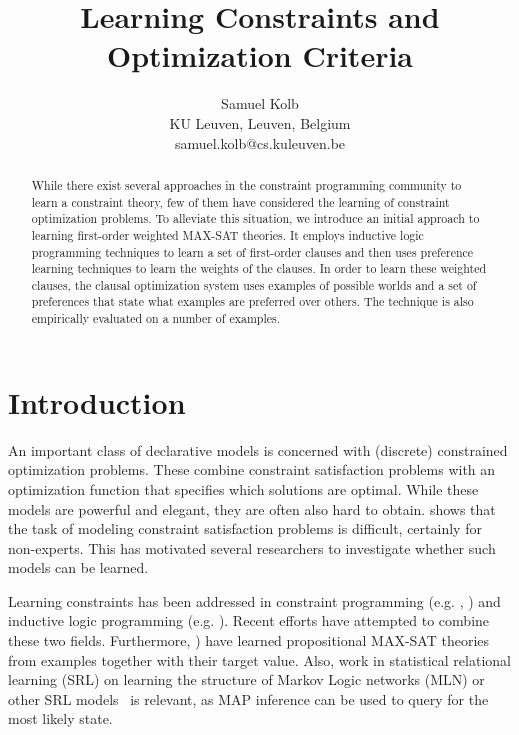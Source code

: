 \documentclass[letterpaper]{article}
\theoremstyle{definition}
\begin{document}
\title{Learning Constraints and Optimization Criteria}
\author{
  Samuel Kolb\\
  KU Leuven, Leuven, Belgium\\
  samuel.kolb@cs.kuleuven.be
}

\maketitle

\begin{abstract}
While there exist several approaches in the constraint programming community to learn a constraint theory, few of them have considered the learning of constraint optimization problems.
To alleviate this situation, we introduce an initial approach to learning first-order weighted MAX-SAT theories. 
It employs inductive logic programming techniques to learn a set of first-order clauses and then uses preference learning techniques to learn the weights of the clauses.
In order to learn these weighted clauses, the clausal optimization system uses examples of possible worlds and a set of preferences that state what examples are preferred over others.
The technique is also empirically evaluated on a number of examples.

\end{abstract}


\section{Introduction}
An important class of declarative models is concerned with (discrete) constrained optimization problems.
These combine constraint satisfaction problems with an optimization function that specifies which solutions are optimal.
While these models are powerful and elegant, they are often also hard to obtain.
\cite{Wallace:PrinciplesCP} shows that the task of modeling constraint satisfaction problems is difficult, certainly for non-experts.
This has motivated several researchers to investigate whether such models can be learned. 

Learning constraints has been addressed in constraint programming (e.g. \cite{Beldiceanu:ModelSeeker}, \cite{bessiere2013constraint}) and inductive logic programming (e.g. \cite{DeRaedt:ClausalDiscovery}).
Recent efforts \cite{Lallouet:LearningCP} have attempted to combine these two fields.
Furthermore, \cite{campigotto2011active}) have learned propositional MAX-SAT theories from examples together with their target value.
Also, work in statistical relational learning (SRL) on learning the structure of Markov Logic networks (MLN) or other SRL models~\anton{[reference]} is relevant, as MAP inference can be used to query for the most likely state. 
\end{document}
